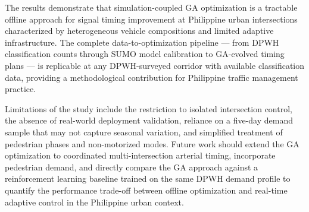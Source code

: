 \documentclass[a4paper,10pt]{article}
\begin{document}
	The results demonstrate that simulation-coupled GA optimization is a tractable offline
	approach for signal timing improvement at Philippine urban intersections characterized
	by heterogeneous vehicle compositions and limited adaptive infrastructure. The
	complete data-to-optimization pipeline --- from DPWH classification counts through
	SUMO model calibration to GA-evolved timing plans --- is replicable at any
	DPWH-surveyed corridor with available classification data, providing a methodological
	contribution for Philippine traffic management practice.

	Limitations of the study include the restriction to isolated intersection control,
	the absence of real-world deployment validation, reliance on a five-day demand sample
	that may not capture seasonal variation, and simplified treatment of pedestrian phases
	and non-motorized modes. Future work should extend the GA optimization to coordinated
	multi-intersection arterial timing, incorporate pedestrian demand, and directly
	compare the GA approach against a reinforcement learning baseline trained on the same
	DPWH demand profile to quantify the performance trade-off between offline optimization
	and real-time adaptive control in the Philippine urban context.
\end{document}
